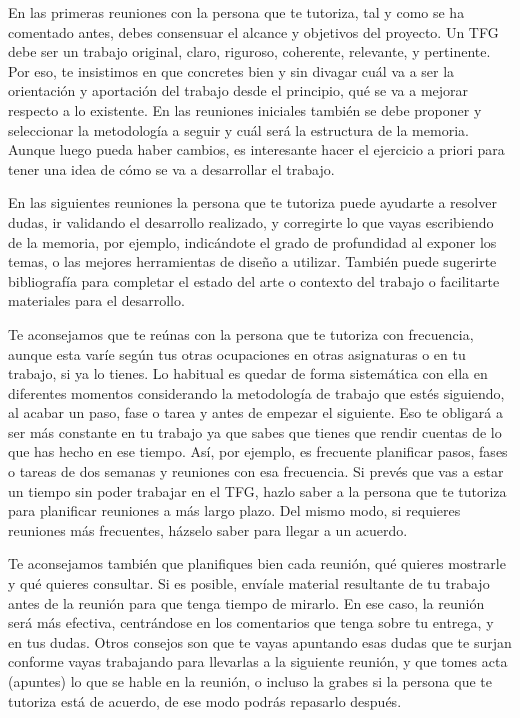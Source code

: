 En las primeras reuniones con la persona que te tutoriza, tal y como se ha comentado antes, debes consensuar el alcance y objetivos del proyecto. Un TFG debe ser un trabajo original, claro, riguroso, coherente, relevante, y pertinente. Por eso, te insistimos en que concretes bien y sin divagar cuál va a ser la orientación y aportación del trabajo desde el principio, qué se va a mejorar respecto a lo existente. En las reuniones iniciales también se debe proponer y seleccionar la metodología a seguir y cuál será la estructura de la memoria. Aunque luego pueda haber cambios, es interesante hacer el ejercicio a priori para tener una idea de cómo se va a desarrollar el trabajo.

En las siguientes reuniones la persona que te tutoriza puede ayudarte a resolver dudas, ir validando el desarrollo realizado, y corregirte lo que vayas escribiendo de la memoria, por ejemplo, indicándote el grado de profundidad al exponer los temas, o las mejores herramientas de diseño a utilizar. También puede sugerirte bibliografía para completar el estado del arte o contexto del trabajo o facilitarte materiales para el desarrollo. 

Te aconsejamos que te reúnas con la persona que te tutoriza con frecuencia, aunque esta varíe según tus otras ocupaciones en otras asignaturas o en tu trabajo, si ya lo tienes. Lo habitual es quedar de forma sistemática con ella en diferentes momentos considerando la metodología de trabajo que estés siguiendo, al acabar un paso, fase o tarea y antes de empezar el siguiente. Eso te obligará a ser más constante en tu trabajo ya que sabes que tienes que rendir cuentas de lo que has hecho en ese tiempo. Así, por ejemplo, es frecuente planificar pasos, fases o tareas de dos semanas y reuniones con esa frecuencia. Si prevés que vas a estar un tiempo sin poder trabajar en el TFG, hazlo saber a la persona que te tutoriza para planificar reuniones a más largo plazo. Del mismo modo, si requieres reuniones más frecuentes, házselo saber para llegar a un acuerdo. 

Te aconsejamos también que planifiques bien cada reunión, qué quieres mostrarle y qué quieres consultar. Si es posible, envíale material resultante de tu trabajo antes de la reunión para que tenga tiempo de mirarlo. En ese caso, la reunión será más efectiva, centrándose en los comentarios que tenga sobre tu entrega, y en tus dudas. Otros consejos son que te vayas apuntando esas dudas que te surjan conforme vayas trabajando para llevarlas a la siguiente reunión, y que tomes acta (apuntes) lo que se hable en la reunión, o incluso la grabes si la persona que te tutoriza está de acuerdo, de ese modo podrás repasarlo después. 

